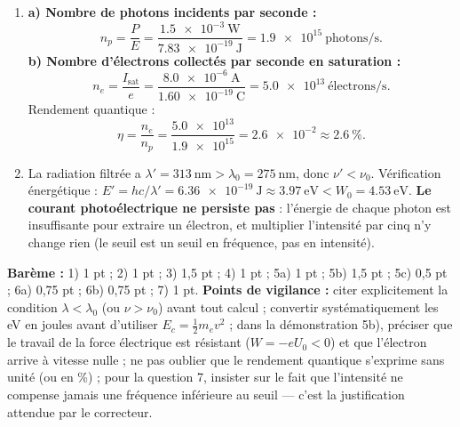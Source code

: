 \documentclass[11pt]{article}
\begin{document}
\begin{corrige}
\begin{enumerate}
Au potentiel d'arrêt, même l'électron le plus rapide arrive sur l'anode avec une vitesse nulle. Le théorème de l'énergie cinétique s'écrit :
\[ \Delta E_c = 0 - E_{c,\max} = W_{C\to A} = -eU_0 \quad\Rightarrow\quad \boxed{eU_0 = E_{c,\max}}. \]
\textbf{c)} $U_0 = \dfrac{E_{c,\max}}{e} = \SI{0,36}{\volt}$.
\item \textbf{a) Nombre de photons incidents par seconde :}
\[ n_p = \frac{P}{E} = \frac{\SI{1,5e-3}{\watt}}{\SI{7,83e-19}{\joule}} = \num{1,9e15}~\text{photons/s}. \]
\textbf{b) Nombre d'électrons collectés par seconde en saturation :}
\[ n_e = \frac{I_{\text{sat}}}{e} = \frac{\SI{8,0e-6}{\ampere}}{\SI{1,60e-19}{\coulomb}} = \num{5,0e13}~\text{électrons/s}. \]
Rendement quantique :
\[ \eta = \frac{n_e}{n_p} = \frac{\num{5,0e13}}{\num{1,9e15}} = \num{2,6e-2} \approx \SI{2,6}{\percent}. \]
\item La radiation filtrée a $\lambda' = \SI{313}{\nano\meter} > \lambda_0 = \SI{275}{\nano\meter}$, donc $\nu' < \nu_0$. Vérification énergétique : $E' = hc/\lambda' = \SI{6,36e-19}{\joule} \approx \SI{3,97}{\electronvolt} < W_0 = \SI{4,53}{\electronvolt}$. \textbf{Le courant photoélectrique ne persiste pas} : l'énergie de chaque photon est insuffisante pour extraire un électron, et multiplier l'intensité par cinq n'y change rien (le seuil est un seuil en fréquence, pas en intensité).
\end{enumerate}
\end{corrige}

\begin{attention}
\textbf{Barème :} 1) 1 pt ; 2) 1 pt ; 3) 1,5 pt ; 4) 1 pt ; 5a) 1 pt ; 5b) 1,5 pt ; 5c) 0,5 pt ; 6a) 0,75 pt ; 6b) 0,75 pt ; 7) 1 pt.
\textbf{Points de vigilance :} citer explicitement la condition $\lambda < \lambda_0$ (ou $\nu > \nu_0$) avant tout calcul ; convertir systématiquement les eV en joules avant d'utiliser $E_c = \frac{1}{2}m_ev^2$ ; dans la démonstration 5b), préciser que le travail de la force électrique est résistant ($W = -eU_0 < 0$) et que l'électron arrive à vitesse nulle ; ne pas oublier que le rendement quantique s'exprime sans unité (ou en \%) ; pour la question 7, insister sur le fait que l'intensité ne compense jamais une fréquence inférieure au seuil — c'est la justification attendue par le correcteur.
\end{attention}
\end{document}
